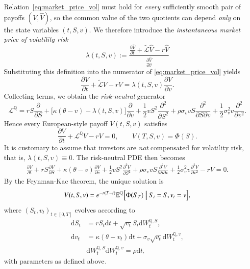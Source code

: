 \documentclass[12pt]{report} %
\theoremstyle{plain} %
\theoremstyle{definition} %
\theoremstyle{remark} %
\begin{document}
Relation~\eqref{eq:market_price_vol} must hold for \emph{every} sufficiently smooth pair of
payoffs $(V,\widehat V)$, so the common value of the two quotients can depend \emph{only} on the
state variables $(t,S,v)$. We therefore introduce the \emph{instantaneous market price of
volatility risk}
\[
 \lambda(t,S,v)
 := \frac{\frac{\partial \widehat V}{\partial t} + \tilde{\mathcal L} \widehat V - r \widehat V}{\frac{\partial \widehat V}{\partial v}}
\]
Substituting this definition into the numerator of \eqref{eq:market_price_vol} yields
\[
 \frac{\partial V}{\partial t}+\tilde{\mathcal L}V-rV
 =
 \lambda(t,S,v)\frac{\partial V}{\partial v}.
\]
Collecting terms, we obtain the \emph{risk-neutral} generator
\[
 \mathcal L^{\mathbb Q}
 =
 rS\frac{\partial}{\partial S}
 +\bigl[\kappa(\theta-v)-\lambda(t,S,v)\bigr]\frac{\partial}{\partial v}
 +\frac12 vS^{2}\frac{\partial^{2}}{\partial S^{2}}
 +\rho\sigma_v vS\frac{\partial^{2}}{\partial S\partial v}
 +\frac12\sigma_v^{2}v\frac{\partial^{2}}{\partial v^{2}} .
\]
Hence every European-style payoff $V(t,S,v)$ satisfies
\begin{equation}\label{eq:heston_pde_lambda}
 \frac{\partial V}{\partial t}
 +\mathcal L^{\mathbb Q} V
 -rV
 =0,
 \qquad
 V(T,S,v)=\Phi(S).
\end{equation}
It is customary to assume that investors are \emph{not} compensated for volatility risk,
that is, $\lambda(t,S,v)\equiv0$. The risk-neutral PDE then becomes
\begin{equation}
\label{eq:heston_pde}
\begin{aligned}
	\frac{\partial V}{\partial t}+
	rS\frac{\partial V}{\partial S}
 +\kappa(\theta-v)\frac{\partial V}{\partial v}
 +\frac12 vS^{2}\frac{\partial^2V}{\partial S^{2}}
 +\rho\sigma_v vS\frac{\partial^2 V}{\partial S\partial v}
 +\frac12\sigma_v^{2}v\frac{\partial^2 V}{\partial v^{2}}
	 -rV
	 = 0.
\end{aligned}
\end{equation}
By the Feynman-Kac theorem, the unique solution is
\begin{equation}\label{eq:heston_fk}
V(t,S,v)=e^{-r(T-t)}\mathbb E^{\mathbb Q}\Bigl[\Phi(S_T)\bigm|S_t=S,v_t=v\Bigr],
\end{equation}
where $(S_t,v_t)_{t\in[0,T]}$ evolves according to
\begin{equation}\label{eq:heston_sde}
\begin{aligned}
 \mathrm{d}S_t &= rS_t\mathrm{d}t + \sqrt{v_t}S_t\mathrm{d}W_t^{\mathbb Q	,S},\\
 \mathrm{d}v_t &= \kappa(\theta-v_t)\mathrm{
d}t + \sigma_v\sqrt{v_t}\mathrm{d}W_t^{\mathbb Q,v},\\
 &\mathrm{d}W_t^{\mathbb Q,S}\mathrm{d}W_t^{\mathbb Q,v} = \rho\mathrm{d}t,
\end{aligned}
\end{equation}
with parameters as defined above.
\end{document}
